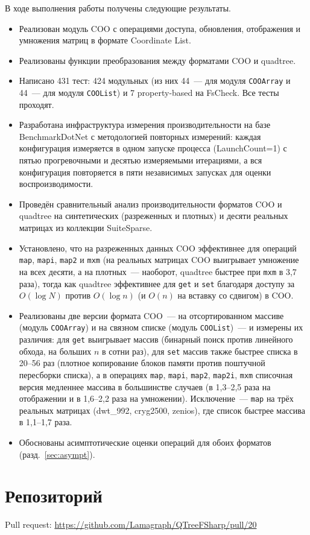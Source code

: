 \documentclass[a4paper]{article}
\begin{document}
В ходе выполнения работы получены следующие результаты.

\begin{itemize}
    \item Реализован модуль COO с операциями доступа, обновления, отображения и умножения матриц в формате Coordinate List.
    \item Реализованы функции преобразования между форматами COO и quadtree.
    \item Написано 431 тест: 424 модульных (из них 44~--- для модуля \texttt{COOArray} и 44~--- для модуля \texttt{COOList}) и 7 property-based на FsCheck. Все тесты проходят.
    \item Разработана инфраструктура измерения производительности на базе BenchmarkDotNet с методологией повторных измерений: каждая конфигурация измеряется в одном запуске процесса (LaunchCount=1) с пятью прогревочными и десятью измеряемыми итерациями, а вся конфигурация повторяется в пяти независимых запусках для оценки воспроизводимости.
    \item Проведён сравнительный анализ производительности форматов COO и quadtree на синтетических (разреженных и плотных) и десяти реальных матрицах из коллекции SuiteSparse.
    \item Установлено, что на разреженных данных COO эффективнее для операций \texttt{map}, \texttt{mapi}, \texttt{map2} и \texttt{mxm} (на реальных матрицах COO выигрывает умножение на всех десяти, а на плотных~--- наоборот, quadtree быстрее при \texttt{mxm} в 3,7 раза), тогда как quadtree эффективнее для \texttt{get} и \texttt{set} благодаря доступу за $O(\log N)$ против $O(\log n)$ (и $O(n)$ на вставку со сдвигом) в COO.
    \item Реализованы две версии формата COO~--- на отсортированном массиве (модуль \texttt{COOArray}) и на связном списке (модуль \texttt{COOList})~--- и измерены их различия: для \texttt{get} выигрывает массив (бинарный поиск против линейного обхода, на больших $n$ в сотни раз), для \texttt{set} массив также быстрее списка в 20--56 раз (плотное копирование блоков памяти против поштучной пересборки списка), а в операциях \texttt{map}, \texttt{mapi}, \texttt{map2}, \texttt{map2i}, \texttt{mxm} списочная версия медленнее массива в большинстве случаев (в 1,3--2,5 раза на отображении и в 1,6--2,2 раза на умножении). Исключение~--- \texttt{map} на трёх реальных матрицах (dwt\_992, cryg2500, zenios), где список быстрее массива в 1,1--1,7 раза.
    \item Обоснованы асимптотические оценки операций для обоих форматов (разд.~\ref{sec:asympt}).
\end{itemize}

\section{Репозиторий}

Pull request: \url{https://github.com/Lamagraph/QTreeFSharp/pull/20}
\end{document}
